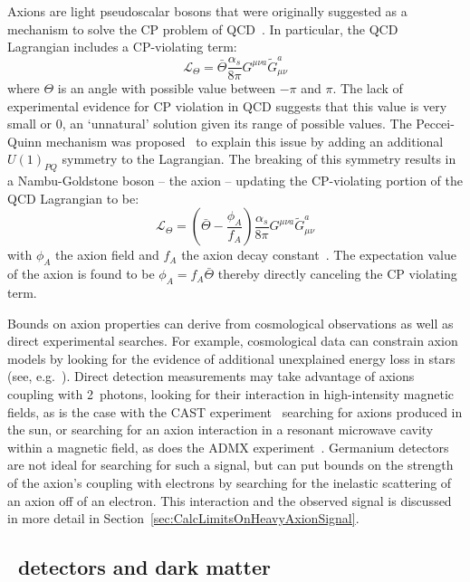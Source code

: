 	Axions are light pseudoscalar bosons that were originally suggested as a mechanism to solve the CP problem of QCD~\cite{Pec77}.  In particular, the QCD Lagrangian includes a CP-violating term:
			\[
			\mathcal{L}_{\Theta} = \bar{\Theta} \frac{\alpha_s}{8 \pi} G^{\mu \nu a} \tilde{G}_{\mu \nu}^{a}
			\]
where $\Theta$ is an angle with possible value between $-\pi$ and $\pi$.  The lack of experimental evidence for CP violation in QCD suggests that this value is very small or 0, an `unnatural' solution given its range of possible values.  The Peccei-Quinn mechanism was proposed~\cite{Pec77} to explain this issue by adding an additional $U(1)_{PQ}$ symmetry to the Lagrangian.  The breaking of this symmetry results in a Nambu-Goldstone boson -- the axion -- updating the CP-violating portion of the QCD Lagrangian to be:
			\[
			\mathcal{L}_{\Theta} = \left( \bar{\Theta} - \frac{\phi_{A}}{f_{A}}\right) \frac{\alpha_s}{8 \pi} G^{\mu \nu a} \tilde{G}_{\mu \nu}^{a}
			\]	
with $\phi_{A}$ the axion field and $f_{A}$ the axion decay constant~\cite{Amsler20081}.  The expectation value of the axion is found to be $\phi_{A} = f_{A} \bar{\Theta}$ thereby directly canceling the CP violating term.  
	
	Bounds on axion properties can derive from cosmological observations as well as direct experimental searches.  For example, cosmological data can constrain axion models by looking for the evidence of additional unexplained energy loss in stars (see, e.g.~\cite{Gondolo09,Raf96}).  Direct detection measurements may take advantage of axions coupling with 2~photons, looking for their interaction in high-intensity magnetic fields, as is the case with the CAST experiment~\cite{Arik09} searching for axions produced in the sun, or searching for an axion interaction in a resonant microwave cavity within a magnetic field, as does the ADMX experiment~\cite{Asz10}.  Germanium detectors are not ideal for searching for such a signal, but can put bounds on the strength of the axion's coupling with electrons by searching for the inelastic scattering of an axion off of an electron.  This interaction and the observed signal is discussed in more detail in Section~\ref{sec:CalcLimitsOnHeavyAxionSignal}.
		
		\subsection{\ppc~detectors and dark matter}

	
	
